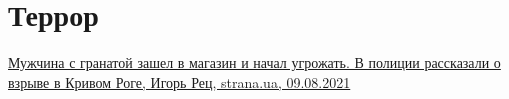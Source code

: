  
 
 
 
 
\chapter{Террор}

\href{https://strana.ua/news/347824-v-krivom-rohe-muzhchina-podorval-hranatu-u-mahazina-i-ostalsja-bez-nohi.html}{%
Мужчина с гранатой зашел в магазин и начал угрожать. В полиции рассказали о взрыве в Кривом Роге, Игорь Рец, strana.ua, 09.08.2021
%
}
